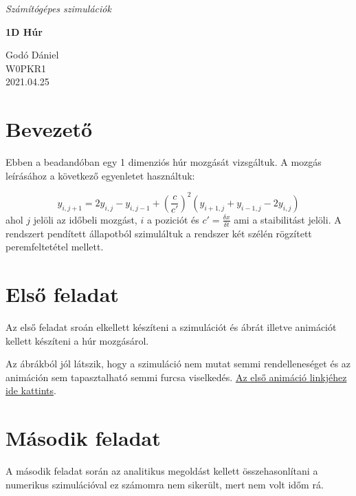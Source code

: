 \documentclass{article}[18pt]
\begin{document}
\begin{titlepage}
\begin{center}
\vspace*{1cm}
 
\Huge
\textit{Számítógépes szimulációk
}
 
\LARGE
\vspace{2cm}
\textbf{1D Húr}
\vfill
    
 
\vspace{0.8cm}
Godó Dániel\\
W0PKR1\\
2021.04.25\\
 
\end{center}
\end{titlepage}
\newpage
 \tableofcontents
 \newpage
\section{Bevezető}
Ebben a beadandóban egy 1 dimenziós húr mozgását vizsgáltuk. A mozgás leírásához a következő egyenletet használtuk:

\begin{equation}
    y_{i,j+1}=2y_{i,j}-y_{i,j-1}+(\frac{c}{c'})^{2}(y_{i+1,j}+y_{i-1,j}-2y_{i,j})
    \label{visibility}
\end{equation}
ahol $j$ jelöli az időbeli mozgást, $i$ a poziciót és $  c'= \frac{\delta x}{\delta t}$  ami a staibilitást jelöli. A rendszert pendített állapotból szimuláltuk a rendszer két szélén rögzített peremfeltetétel mellett.

\section{Első feladat}
Az első feladat sroán elkellett készíteni a szimulációt és ábrát illetve animációt kellett készíteni a húr mozgásárol.

\begin{figure}[h]
    \centering
\end{figure}

Az ábrákból jól látszik, hogy a szimuláció nem mutat semmi rendelleneséget és az animáción sem tapasztalható semmi furcsa viselkedés. \href{https://gph.is/g/4D8ppYj}{Az első animáció linkjéhez ide kattints}.

\section{Második feladat}
A második feladat során az analitikus megoldást kellett összehasonlítani a numerikus szimulációval ez számomra nem sikerült, mert nem volt időm rá.
\end{document}

